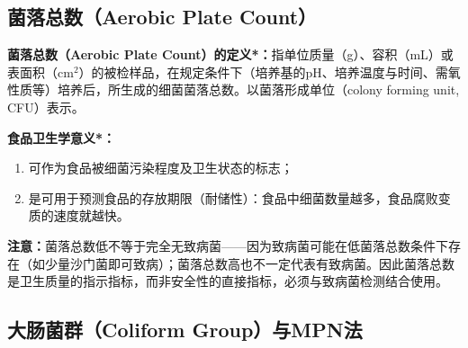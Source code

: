 \subsection{菌落总数（Aerobic Plate Count）}

\begin{keybox}
\textbf{菌落总数（Aerobic Plate Count）的定义*：}指单位质量（g）、容积（mL）或表面积（$\text{cm}^2$）的被检样品，在规定条件下（培养基的pH、培养温度与时间、需氧性质等）培养后，所生成的细菌菌落总数。以菌落形成单位（colony forming unit, CFU）表示。

\textbf{食品卫生学意义*：}
\begin{enumerate}[leftmargin=*]
    \item 可作为食品被细菌污染程度及卫生状态的标志；
    \item 是可用于预测食品的存放期限（耐储性）：食品中细菌数量越多，食品腐败变质的速度就越快。
\end{enumerate}
\end{keybox}

\begin{tipbox}
\textbf{注意：}菌落总数低不等于完全无致病菌——因为致病菌可能在低菌落总数条件下存在（如少量沙门菌即可致病）；菌落总数高也不一定代表有致病菌。因此菌落总数是卫生质量的指示指标，而非安全性的直接指标，必须与致病菌检测结合使用。
\end{tipbox}

\subsection{大肠菌群（Coliform Group）与MPN法}

